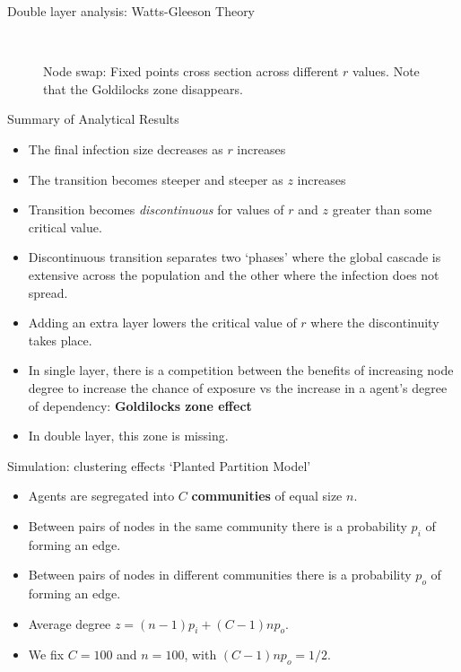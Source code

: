 \documentclass[10pt, xcolor=dvipsnames]{beamer}
\begin{document}
\begin{frame}{Double layer analysis: Watts-Gleeson Theory}
\begin{figure}
\begin{subfigure}[b]{0.4\textwidth}
    \end{subfigure}
    ~
    \caption{Node swap: Fixed points cross section across different $r$ values. Note that the Goldilocks zone disappears. }
\end{figure}
\end{frame}

\begin{frame}{Summary of Analytical Results}
\begin{itemize}
\pause \item The final infection size decreases as $r$ increases
\pause \item The transition becomes steeper and steeper as $z$ increases
\pause \item Transition becomes \emph{discontinuous} for values of $r$ and $z$ greater than some critical value.
\pause \item Discontinuous transition separates two `phases' where the global cascade is extensive across the population and the other where the infection does not spread.
\pause \item Adding an extra layer lowers the critical value of $r$ where the discontinuity takes place.
\pause \item In single layer, there is a competition between the benefits of increasing node degree to increase the chance of exposure vs the increase in a agent's degree of dependency: \textbf{Goldilocks zone effect}
\pause \item In double layer, this zone is missing.
\end{itemize}
\end{frame}

\begin{frame}{Simulation: clustering effects}
`Planted Partition Model'
\begin{itemize}
\item Agents are segregated into $C$ \textbf{communities} of equal size $n$.
\pause \item Between pairs of nodes in the same community there is a probability $p_i$ of forming an edge.
\pause \item Between pairs of nodes in different communities there is a probability $p_o$ of forming an edge.
\pause \item Average degree $z = (n-1)p_i + (C-1)np_o$.
\pause \item We fix $C=100$ and $n=100$, with $(C-1)np_o = 1/2$.
\end{itemize}
\end{frame}
\end{document}

